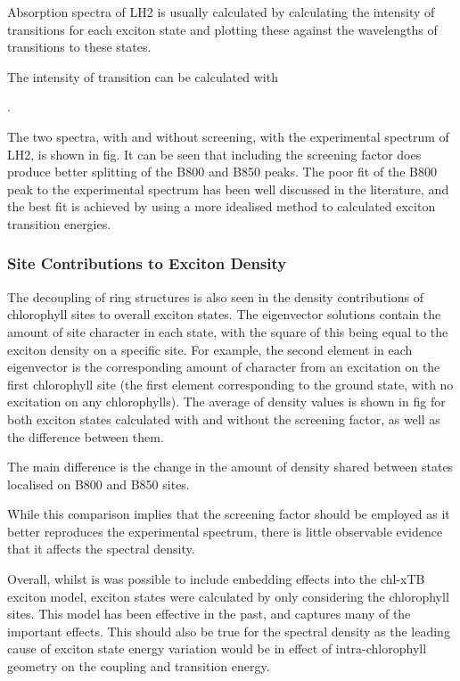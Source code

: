 Absorption spectra of LH2 is usually calculated by calculating the intensity of 
transitions for each exciton state and plotting these against the wavelengths of
transitions to these states. 

The intensity of transition can be calculated with

. 

The two spectra, with and without screening, with the experimental spectrum of LH2,
is shown in fig. It can be seen that including the screening factor does produce
better splitting of the B800 and B850 peaks. The poor fit of the B800 peak to the
experimental spectrum has been well discussed in the literature, and the best fit
is achieved by using a more idealised method to calculated exciton transition energies.

\subsubsection{Site Contributions to Exciton Density}
\label{subsubsec:site_dens}

The decoupling of ring structures is also seen in the density contributions of chlorophyll
sites to overall exciton states. The eigenvector solutions contain the amount of
site character in each state, with the square of this being equal to the exciton
density on a specific site. For example, the second element in each eigenvector 
is the corresponding amount of character from an excitation on the first chlorophyll
site (the first element corresponding to the ground state, with no excitation on
any chlorophylls). The average of density values is shown in fig for both exciton
states calculated with and without the screening factor, as well as the difference
between them.


The main difference is the change in the amount of density shared between states
localised on B800 and B850 sites. 



While this comparison implies that the screening factor should be employed as it
better reproduces the experimental spectrum, there is little observable evidence
that it affects the spectral density.


Overall, whilst is was possible to include embedding effects into the chl-xTB exciton
model, exciton states were calculated by only considering the chlorophyll sites.
This model has been effective in the past, and captures many of the important effects.
This should also be true for the spectral density as the leading cause of exciton
state energy variation would be in effect of intra-chlorophyll geometry on the 
coupling and transition energy.

